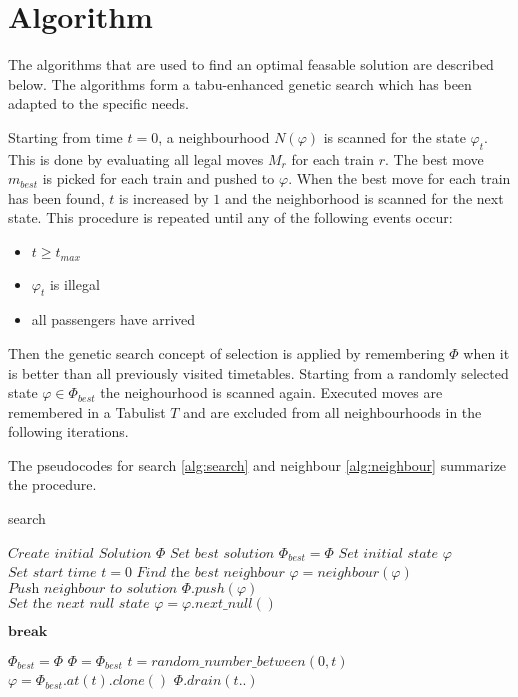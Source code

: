 \documentclass[a4paper,12pt,parskip]{article}
\begin{document}
\section{Algorithm}

The algorithms that are used to find an optimal feasable solution are described 
below. The algorithms form a tabu-enhanced genetic search which has been adapted 
to the specific needs. 

Starting from time $t=0$, a neighbourhood $N(\varphi)$ is scanned for the state 
$\varphi_t$. This is done by evaluating all legal moves $M_r$ for each train $r$. 
The best move $m_{best}$ is picked for each train and pushed to $\varphi$. When 
the best move for each train has been found, $t$ is increased by $1$ and the 
neighborhood is scanned for the next state. This procedure is repeated until any 
of the following events occur:

\begin{itemize}
    \item $t \ge t_{max}$
    \item $\varphi_t$ is illegal
    \item all passengers have arrived
\end{itemize}

Then the genetic search concept of selection is applied by remembering $\Phi$ 
when it is better than all previously visited timetables. Starting from a 
randomly selected state $\varphi \in \Phi_{best}$ the neighourhood is scanned 
again. Executed moves are remembered in a Tabulist $T$ and are excluded from all 
neighbourhoods in the following iterations.

The pseudocodes for search \ref{alg:search} and neighbour \ref{alg:neighbour}
summarize the procedure.

\begin{algorithm}
\caption{search}\label{alg:search}
\begin{algorithmic}
    \State $\textit{Create initial Solution } \Phi$
    \State $\textit{Set best solution } \Phi_{best} = \Phi$
    \State $\textit{Set initial state } \varphi$
    \State $\textit{Set start time } t=0$
            \State $\textit{Find the best neighbour } \varphi = neighbour(\varphi)$
            \State $\textit{Push neighbour to solution } \Phi.push(\varphi)$
            \State $\textit{Set the next null state } \varphi = \varphi.next\_null()$

                \State $\textbf{break}$
            \EndIf
        \EndWhile

            \State $\Phi_{best} = \Phi$
        \Else
            \State $\Phi = \Phi_{best}$
        \EndIf  
        \State $t = random\_number\_between(0, t)$
        \State $\varphi = \Phi_{best}.at(t).clone()$
        \State $\Phi.drain(t..)$
    \EndWhile
\end{algorithmic}
\end{algorithm}
\end{document}
